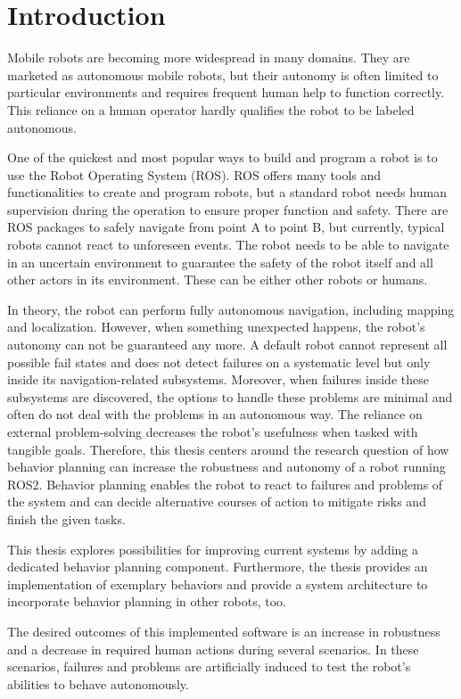 \chapter{Introduction}
\label{cha:introduction}

Mobile robots are becoming more widespread in many domains. They are marketed as autonomous mobile robots, but their autonomy is often limited to particular environments and requires frequent human help to function correctly. This reliance on a human operator hardly qualifies the robot to be labeled autonomous. 

One of the quickest and most popular ways to build and program a robot is to use the Robot Operating System (ROS). ROS offers many tools and functionalities to create and program robots, but a standard robot needs human supervision during the operation to ensure proper function and safety. There are ROS packages to safely navigate from point A to point B, but currently, typical robots cannot react to unforeseen events. The robot needs to be able to navigate in an uncertain environment to guarantee the safety of the robot itself and all other actors in its environment. These can be either other robots or humans. 

In theory, the robot can perform fully autonomous navigation, including mapping and localization. However, when something unexpected happens, the robot's autonomy can not be guaranteed any more. A default robot cannot represent all possible fail states and does not detect failures on a systematic level but only inside its navigation-related subsystems. Moreover, when failures inside these subsystems are discovered, the options to handle these problems are minimal and often do not deal with the problems in an autonomous way. The reliance on external problem-solving decreases the robot's usefulness when tasked with tangible goals. 
Therefore, this thesis centers around the research question of how behavior planning can increase the robustness and autonomy of a robot running ROS2. Behavior planning enables the robot to react to failures and problems of the system and can decide alternative courses of action to mitigate risks and finish the given tasks.

This thesis explores possibilities for improving current systems by adding a dedicated behavior planning component. Furthermore, the thesis provides an implementation of exemplary behaviors and provide a system architecture to incorporate behavior planning in other robots, too.

The desired outcomes of this implemented software is an increase in robustness and a decrease in required human actions during several scenarios. In these scenarios, failures and problems are artificially induced to test the robot's abilities to behave autonomously. 


